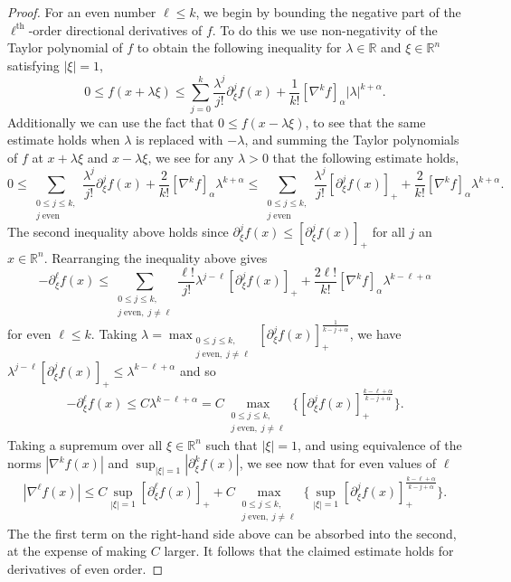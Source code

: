 \documentclass[oneside,hidelinks,indentfirst,10pt]{book}
\begin{document}
\begin{proof}
For an even number \(\ell\leq k\), we begin by bounding the negative part of the \(\ell^\mathrm{th}\)-order directional derivatives of \(f\). To do this we use non-negativity of the Taylor polynomial of \(f\) to obtain the following inequality for \(\lambda\in\mathbb{R}\) and \(\mathbb{\xi}\in\mathbb{R}^n\) satisfying \(|\xi|=1\),
\[
    0\leq f(x+\lambda\xi)\leq  \sum_{j=0}^k\frac{\lambda^j}{j!}\partial^j_\xi f(x)+\frac{1}{k!}[\nabla^k f]_\alpha|\lambda|^{k+\alpha}.
\]
Additionally we can use the fact that \(0\leq f(x-\lambda\xi)\), to see that the same estimate holds when \(\lambda\) is replaced with \(-\lambda\), and summing the Taylor polynomials of \(f\) at \(x+\lambda\xi\) and \(x-\lambda\xi\), we see for any \(\lambda>0\) that the following estimate holds,
\[
    0\leq \sum_{\substack{0\leq j\leq k,\\ j\;\textrm{even}}}\frac{\lambda^j}{j!}\partial^j_\xi f(x)+\frac{2}{k!}[\nabla^k f]_\alpha\lambda^{k+\alpha}\leq \sum_{\substack{0\leq j\leq k,\\ j\;\textrm{even}}}\frac{\lambda^j}{j!}[\partial^j_\xi f(x)]_++\frac{2}{k!}[\nabla^k f]_\alpha\lambda^{k+\alpha}.
\]
The second inequality above holds since \(\partial^j_\xi f(x)\leq [\partial^j_\xi f(x)]_+\) for all \(j\) an \(x\in\mathbb{R}^n\). Rearranging the inequality above gives
\[
    -\partial_\xi^\ell f(x)\leq\sum_{\substack{0\leq j\leq k,\\ j\;\textrm{even},\;j\neq\ell}}\frac{\ell!}{j!}\lambda^{j-\ell}[\partial^j_\xi f(x)]_++\frac{2\ell!}{k!}[\nabla^k f]_\alpha\lambda^{k-\ell+\alpha}
\]
for even \(\ell\leq k\).
Taking \(\lambda=\displaystyle\max_{\substack{0\leq j\leq k,\\ j\;\textrm{even},\;j\neq\ell}}[\partial^j_\xi f(x)]_+^\frac{1}{k-j+\alpha}\), we have \(\lambda^{j-\ell}[\partial^j_\xi f(x)]_+\leq \lambda^{k-\ell+\alpha}\) and so
\[
    -\partial_\xi^\ell f(x)\leq C\lambda^{k-\ell+\alpha}=C\max_{\substack{0\leq j\leq k,\\ j\;\textrm{even},\;j\neq\ell}}\bigg\{[\partial^j_\xi f(x)]_+^\frac{k-\ell+\alpha}{k-j+\alpha}\bigg\}.
\]
Taking a supremum over all \(\xi\in\mathbb{R}^n\) such that \(|\xi|=1\), and using equivalence of the norms \(|\nabla^kf(x)|\) and \(\sup_{|\xi|=1}|\partial^k_\xi f(x)|\), we see now that for even values of \(\ell\)
\[
    |\nabla^\ell f(x)|\leq C\sup_{|\xi|=1}[\partial_\xi^\ell f(x)]_++C\max_{\substack{0\leq j\leq k,\\ j\;\textrm{even},\;j\neq\ell}}\bigg\{\sup_{|\xi|=1}[\partial^j_\xi f(x)]_+^\frac{k-\ell+\alpha}{k-j+\alpha}\bigg\}.
\]
The the first term on the right-hand side above can be absorbed into the second, at the expense of making \(C\) larger. It follows that the claimed estimate holds for derivatives of even order.



\end{proof}
\end{document}
